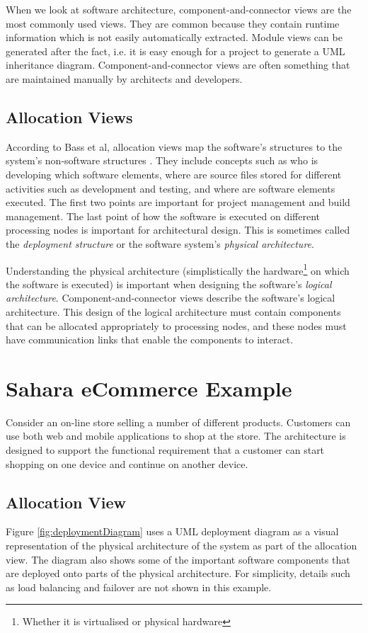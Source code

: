 When we look at software architecture, component-and-connector views are the most commonly used views.
They are common because they contain runtime information which is not easily automatically extracted.
Module views can be generated after the fact, i.e. it is easy enough for a project to generate a UML inheritance diagram.
Component-and-connector views are often something that are maintained manually by architects and developers.

\subsection{Allocation Views}
According to Bass et al, allocation views map the software's structures to the system's non-software structures \cite{bass2021software}.
They include concepts such as who is developing which software elements,
where are source files stored for different activities such as development and testing,
and where are software elements executed.
The first two points are important for project management and build management.
The last point of how the software is executed on different processing nodes is important for architectural design.
This is sometimes called the \emph{deployment structure} or the software system's \emph{physical architecture}.

Understanding the physical architecture (simplistically the hardware\footnote{Whether it is virtualised or physical hardware}
on which the software is executed) is important when designing the software's \emph{logical architecture}.
Component-and-connector views describe the software's logical architecture.
This design of the logical architecture must contain components that can be allocated appropriately to processing nodes,
and these nodes must have communication links that enable the components to interact.

\section{Sahara eCommerce Example}\label{sec:storeExample}
Consider an on-line store selling a number of different products. Customers can use both web and mobile applications to shop at the store.
The architecture is designed to support the functional requirement that a customer can start shopping on one device and continue on another device.

\subsection{Allocation View}\label{sec:storeAllocView}
Figure \ref{fig:deploymentDiagram} uses a UML deployment diagram as a visual representation of the physical architecture of the system as part of the allocation view.
The diagram also shows some of the important software components that are deployed onto parts of the physical architecture.
For simplicity, details such as load balancing and failover are not shown in this example.

